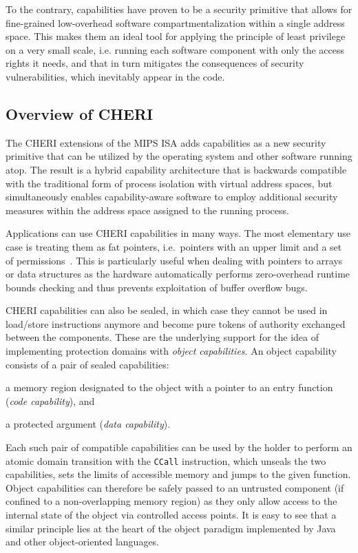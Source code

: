 \documentclass[a4paper,12pt,twoside,openright]{report}
\newcommand{\insn}[1]{\texttt{#1}}
\begin{document}
To the contrary, capabilities have proven to be a security primitive that allows for fine-grained low-overhead software compartmentalization within a single address space. This makes them an ideal tool for applying the principle of least privilege on a very small scale, i.e. running each software component with only the access rights it needs, and that in turn mitigates the consequences of security vulnerabilities, which inevitably appear in the code. 

\subsection{Overview of CHERI}

The CHERI extensions of the MIPS ISA adds capabilities as a new security primitive that can be utilized by the operating system and other software running atop. The result is a hybrid capability architecture that is backwards compatible with the traditional form of process isolation with virtual address spaces, but simultaneously enables capability-aware software to employ additional security measures within the address space assigned to the running process.

Applications can use CHERI capabilities in many ways. The most elementary use case is treating them as fat pointers, i.e.\ pointers with an upper limit and a set of permissions~\cite{kwon2013low}. This is particularly useful when dealing with pointers to arrays or data structures as the hardware automatically performs zero-overhead runtime bounds checking and thus prevents exploitation of buffer overflow bugs. 

CHERI capabilities can also be sealed, in which case they cannot be used in load/store instructions anymore and become pure tokens of authority exchanged between the components. These are the underlying support for the idea of implementing protection domains with \emph{object capabilities}. An object capability consists of a pair of sealed capabilities: 
\begin{inparaenum}
\item a memory region designated to the object with a pointer to an entry function (\emph{code capability}), and
\item a protected argument (\emph{data capability}).
\end{inparaenum}
Each such pair of compatible capabilities can be used by the holder to perform an atomic domain transition with the \insn{CCall} instruction, which unseals the two capabilities, sets the limits of accessible memory and jumps to the given function. Object capabilities can therefore be safely passed to an untrusted component (if confined to a non-overlapping memory region) as they only allow access to the internal state of the object via controlled access points. It is easy to see that a similar principle lies at the heart of the object paradigm implemented by Java and other object-oriented languages.
\end{document}

